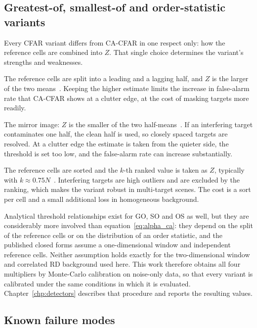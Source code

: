 \subsection{Greatest-of, smallest-of and order-statistic variants}

Every CFAR variant differs from CA-CFAR in one respect only: how the reference cells are combined
into $Z$. That single choice determines the variant's strengths and weaknesses.

\begin{description}
\itemsep3pt
\item[GO-CFAR (greatest-of).] The reference cells are split into a leading and a lagging half, and
$Z$ is the larger of the two means~\cite{hansen1980go}. Keeping the higher estimate limits the
increase in false-alarm rate that CA-CFAR shows at a clutter edge, at the cost of masking targets
more readily.
\item[SO-CFAR (smallest-of).] The mirror image: $Z$ is the smaller of the two
half-means~\cite{weiss1982modified}. If an
interfering target contaminates one half, the clean half is used, so closely spaced targets are
resolved. At a clutter edge the estimate is taken from the quieter side, the threshold is set too
low, and the false-alarm rate can increase substantially.
\item[OS-CFAR (order-statistic).] The reference cells are sorted and the $k$-th ranked value is
taken as $Z$, typically with $k \approx 0.75N$~\cite{rohling1983os}. Interfering targets are high outliers and are
excluded by the ranking, which makes the variant robust in multi-target scenes. The cost is a sort
per cell and a small additional loss in homogeneous background.
\end{description}

Analytical threshold relationships exist for GO, SO and OS as well, but they are considerably more
involved than equation~\eqref{eq:alpha_ca}: they depend on the split of the reference cells or on
the distribution of an order statistic, and the published closed forms assume a one-dimensional
window and independent reference cells. Neither assumption holds exactly for the
two-dimensional window and correlated RD background used here. This work therefore obtains all four
multipliers by Monte-Carlo calibration on noise-only data, so that every variant is calibrated
under the same conditions in which it is evaluated. Chapter~\ref{chp:detectors} describes that
procedure and reports the resulting values.

\subsection{Known failure modes}
\label{sec:cfar_failures}

